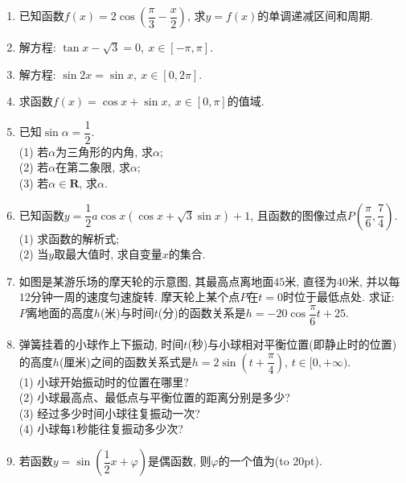\documentclass[10pt,a4paper]{article}
\newcommand{\bracket}[1]{(\hbox to #1pt{})}
\begin{document}
\begin{enumerate}[1.]
\item 已知函数$f(x)=2\cos (\dfrac{\pi}3-\dfrac x2)$, 求$y=f(x)$的单调递减区间和周期.
\item 解方程: $\tan x-\sqrt 3=0, \ x\in [-\pi ,\pi]$.
\item 解方程: $\sin 2x=\sin x, \ x\in [0,2\pi]$.
\item 求函数$f(x)=\cos x+\sin x, \ x\in [0,\pi]$的值域.
\item 已知$\sin \alpha =\dfrac 12$.\\
(1) 若$\alpha$为三角形的内角, 求$\alpha$;\\
(2) 若$\alpha$在第二象限, 求$\alpha$;\\
(3) 若$\alpha \in \mathbf{R}$, 求$\alpha$.
\item 已知函数$y=\dfrac 12a\cos x(\cos x+\sqrt 3\sin x)+1$, 且函数的图像过点$P(\dfrac{\pi}6,\dfrac 74)$.\\
(1) 求函数的解析式;\\
(2) 当$y$取最大值时, 求自变量$x$的集合.
\item 如图是某游乐场的摩天轮的示意图, 其最高点离地面$45$米, 直径为$40$米, 并以每$12$分钟一周的速度匀速旋转. 摩天轮上某个点$P$在$t=0$时位于最低点处. 求证: $P$离地面的高度$h$(米)与时间$t$(分)的函数关系是$h=-20\cos \dfrac{\pi}6t+25$.
\begin{center}
\end{center}
\item 弹簧挂着的小球作上下振动, 时间$t$(秒)与小球相对平衡位置(即静止时的位置)的高度$h$(厘米)之间的函数关系式是$h=2\sin (t+\dfrac{\pi}4)$, $t\in [0,+\infty)$.\\
(1) 小球开始振动时的位置在哪里?\\
(2) 小球最高点、最低点与平衡位置的距离分别是多少?\\
(3) 经过多少时间小球往复振动一次?\\
(4) 小球每$1$秒能往复振动多少次?
\item 若函数$y=\sin (\dfrac 12x+\varphi)$是偶函数, 则$\varphi$的一个值为\bracket{20}.

\end{enumerate}
\end{document}
